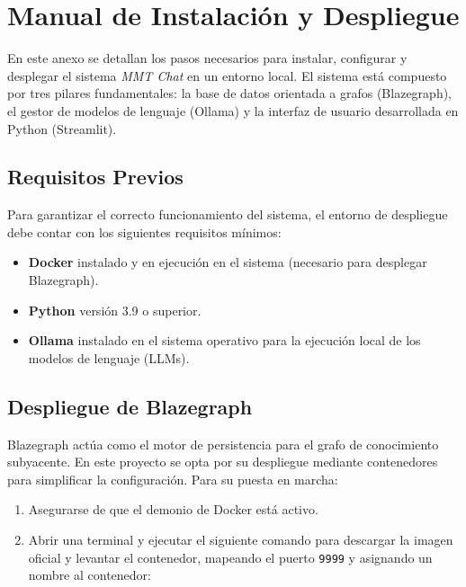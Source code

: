 
\chapter{Manual de Instalación y Despliegue}
\label{anexo:manual_instalacion}

En este anexo se detallan los pasos necesarios para instalar, configurar y desplegar el sistema \textit{MMT Chat} en un entorno local. El sistema está compuesto por tres pilares fundamentales: la base de datos orientada a grafos (Blazegraph), el gestor de modelos de lenguaje (Ollama) y la interfaz de usuario desarrollada en Python (Streamlit).

\section{Requisitos Previos}

Para garantizar el correcto funcionamiento del sistema, el entorno de despliegue debe contar con los siguientes requisitos mínimos:
\begin{itemize}
    \item \textbf{Docker} instalado y en ejecución en el sistema (necesario para desplegar Blazegraph).
    \item \textbf{Python} versión 3.9 o superior.
    \item \textbf{Ollama} instalado en el sistema operativo para la ejecución local de los modelos de lenguaje (LLMs).
\end{itemize}

\section{Despliegue de Blazegraph}

Blazegraph actúa como el motor de persistencia para el grafo de conocimiento subyacente. En este proyecto se opta por su despliegue mediante contenedores para simplificar la configuración. Para su puesta en marcha:

\begin{enumerate}
    \item Asegurarse de que el demonio de Docker está activo.
    \item Abrir una terminal y ejecutar el siguiente comando para descargar la imagen oficial y levantar el contenedor, mapeando el puerto \texttt{9999} y asignando un nombre al contenedor:
\end{enumerate}

